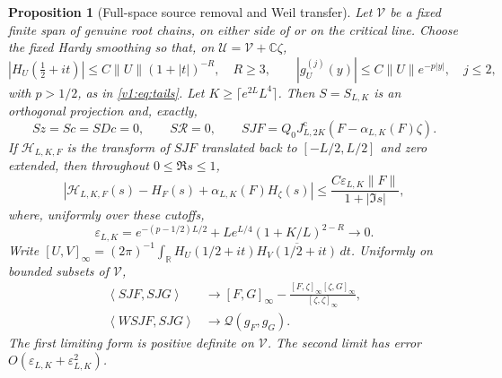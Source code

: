 \documentclass[11pt]{article}
\newtheorem{proposition}[theorem]{Proposition}
\theoremstyle{remark}
\newcommand{\ip}[2]{\left\langle #1,#2\right\rangle}
\newcommand{\Q}{\mathcal Q}
\newcommand{\Jc}{J^{\mathrm c}}
\begin{document}
\begin{proposition}[Full-space source removal and Weil transfer]
\label{prop:v18-full-projection}
Let $\mathcal V$ be a fixed finite span of genuine root chains,
on either side of or on the critical line. Choose the fixed Hardy
smoothing so that, on $\mathcal U=\mathcal V+\mathbb C\zeta$,
\[
 |H_U(\tfrac12+it)|\le C\|U\|(1+|t|)^{-R},\quad R\ge3,
 \qquad |g_U^{(j)}(y)|\le C\|U\|e^{-p|y|},\quad j\le2,
\]
with $p>1/2$, as in \eqref{v1:eq:tails}. Let
$K\ge\lceil e^{2L}L^4\rceil$. Then $S=S_{L,K}$ is an orthogonal
projection and, exactly,
\begin{equation}\label{eq:v18-full-annihilation}
 Sz=Sc=SDc=0,\qquad S\mathcal R=0,\qquad
 SJF=Q_0\Jc_{L,2K}(F-\alpha_{L,K}(F)\zeta).
\end{equation}
If $\mathcal H_{L,K,F}$ is the transform of $SJF$ translated back
to $[-L/2,L/2]$ and zero extended, then throughout $0\le\Re s\le1$,
\begin{equation}\label{eq:v18-full-strip}
 \left|\mathcal H_{L,K,F}(s)-H_F(s)
             +\alpha_{L,K}(F)H_\zeta(s)\right|
 \le \frac{C\varepsilon_{L,K}\|F\|}{1+|\Im s|},
\end{equation}
where, uniformly over these cutoffs,
\[
 \varepsilon_{L,K}
 =e^{-(p-1/2)L/2}
       +Le^{L/4}(1+K/L)^{2-R}\longrightarrow0.
\]
Write $[U,V]_\infty=(2\pi)^{-1}\int_{\mathbb R}
H_U(1/2+it)\overline{H_V(1/2+it)}\,dt$. Uniformly on bounded
subsets of $\mathcal V$,
\begin{align}
 \ip{SJF}{SJG}&\longrightarrow
 [F,G]_\infty-
 \frac{[F,\zeta]_\infty[\zeta,G]_\infty}{[\zeta,\zeta]_\infty},
       \label{eq:v18-full-gram}\\
 \ip{WSJF}{SJG}&\longrightarrow\Q(g_F,g_G).
       \label{eq:v18-full-weil}
\end{align}
The first limiting form is positive definite on $\mathcal V$.
The second limit has error $O(\varepsilon_{L,K}+\varepsilon_{L,K}^2)$.
\end{proposition}
\end{document}
